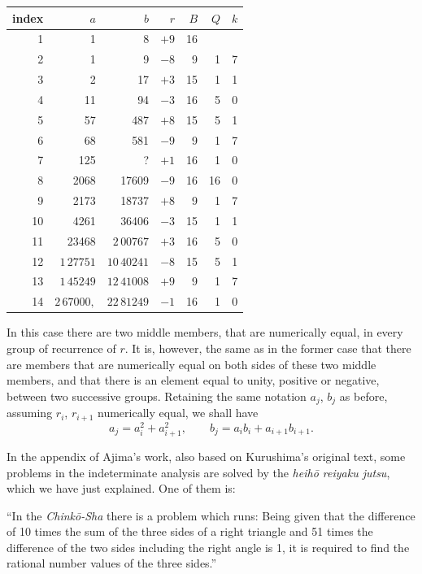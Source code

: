 \documentclass[11pt]{article}
\begin{document}
\begin{center}
\small
\begin{tabular}{|r|r|r|r|r|r|r|}
\hline
index & $a$ & $b$ & $r$ & $B$ & $Q$ & $k$\\
\hline
1  & 1          & 8          & $+9$ & 16 &   &  \\
2  & 1          & 9          & $-8$ & 9  & 1 & 7\\
3  & 2          & 17         & $+3$ & 15 & 1 & 1\\
4  & 11         & 94         & $-3$ & 16 & 5 & 0\\
5  & 57         & 487        & $+8$ & 15 & 5 & 1\\
6  & 68         & 581        & $-9$ & 9  & 1 & 7\\
7  & 125        & ?          & $+1$ & 16 & 1 & 0\\
8  & 2068       & 17609      & $-9$ & 16 & 16& 0\\
9  & 2173       & 18737      & $+8$ & 9  & 1 & 7\\
10 & 4261       & 36406      & $-3$ & 15 & 1 & 1\\
11 & 23468      & $2\,00767$ & $+3$ & 16 & 5 & 0\\
12 & $1\,27751$ & $10\,40241$& $-8$ & 15 & 5 & 1\\
13 & $1\,45249$ & $12\,41008$& $+9$ & 9  & 1 & 7\\
14 & $2\,67000,$& $22\,81249$& $-1$ & 16 & 1 & 0\\
\end{tabular}
\end{center}

In this case there are two middle members, that are numerically equal, in every group of recurrence of $r$. It is, however, the same as in the former case that there are members that are numerically equal on both sides of these two middle members, and that there is an element equal to unity, positive or negative, between two successive groups. Retaining the same notation $a_j$, $b_j$ as before, assuming $r_i$, $r_{i+1}$ numerically equal, we shall have
\[
a_j=a_i^2+a_{i+1}^2,\qquad b_j=a_ib_i+a_{i+1}b_{i+1}.
\]

In the appendix of Ajima's work, also based on Kurushima's original text, some problems in the indeterminate analysis are solved by the \emph{heihō reiyaku jutsu}, which we have just explained. One of them is:

``In the \emph{Chinkō-Sha} there is a problem which runs: Being given that the difference of 10 times the sum of the three sides of a right triangle and 51 times the difference of the two sides including the right angle is 1, it is required to find the rational number values of the three sides.''
\end{document}
